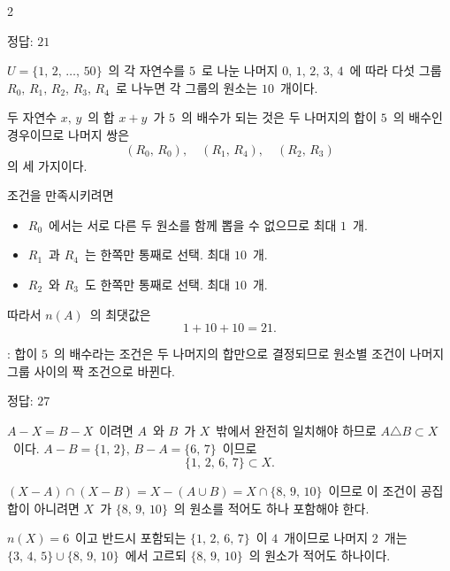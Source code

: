 \documentclass[10pt,fleqn]{article}
\begin{document}
\dmsoltitlefirsttrue
\begin{multicols*}{2}

\begin{dmanswerbox}
정답: $21$
\end{dmanswerbox}

$U=\{1,\,2,\,\ldots,\,50\}$\ 의 각 자연수를 $5$\ 로 나눈 나머지 $0,\,1,\,2,\,3,\,4$\ 에 따라 다섯 그룹 $R_{0},\,R_{1},\,R_{2},\,R_{3},\,R_{4}$\ 로 나누면 각 그룹의 원소는 $10$\ 개이다.

두 자연수 $x,\,y$\ 의 합 $x+y$\ 가 $5$\ 의 배수가 되는 것은 두 나머지의 합이 $5$\ 의 배수인 경우이므로 나머지 쌍은
\[ (R_{0},\,R_{0}),\quad (R_{1},\,R_{4}),\quad (R_{2},\,R_{3}) \]
의 세 가지이다.

조건을 만족시키려면
\begin{itemize}[leftmargin=8mm, itemsep=0.5mm, topsep=1mm]
  \item $R_{0}$\ 에서는 서로 다른 두 원소를 함께 뽑을 수 없으므로 최대 $1$\ 개.
  \item $R_{1}$\ 과 $R_{4}$\ 는 한쪽만 통째로 선택. 최대 $10$\ 개.
  \item $R_{2}$\ 와 $R_{3}$\ 도 한쪽만 통째로 선택. 최대 $10$\ 개.
\end{itemize}

따라서 $n(A)$\ 의 최댓값은
\[ 1+10+10=21. \]

\begin{dmcriticalpoint}
: 합이 $5$\ 의 배수라는 조건은 두 나머지의 합만으로 결정되므로 원소별 조건이 나머지 그룹 사이의 짝 조건으로 바뀐다.
\end{dmcriticalpoint}

\begin{dmanswerbox}
정답: $27$
\end{dmanswerbox}

$A-X=B-X$\ 이려면 $A$\ 와 $B$\ 가 $X$\ 밖에서 완전히 일치해야 하므로 $A\triangle B\subset X$\ 이다. $A-B=\{1,\,2\},\,B-A=\{6,\,7\}$\ 이므로
\[ \{1,\,2,\,6,\,7\}\subset X. \]

$(X-A)\cap(X-B)=X-(A\cup B)=X\cap\{8,\,9,\,10\}$\ 이므로 이 조건이 공집합이 아니려면 $X$\ 가 $\{8,\,9,\,10\}$\ 의 원소를 적어도 하나 포함해야 한다.

$n(X)=6$\ 이고 반드시 포함되는 $\{1,\,2,\,6,\,7\}$\ 이 $4$\ 개이므로 나머지 $2$\ 개는 $\{3,\,4,\,5\}\cup\{8,\,9,\,10\}$\ 에서 고르되 $\{8,\,9,\,10\}$\ 의 원소가 적어도 하나이다.


\end{multicols*}
\end{document}
